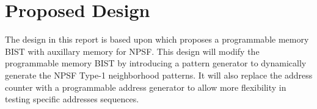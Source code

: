 \chapter{Proposed Design}
\label{chap:design}

The design in this report is based upon \cite{1584083} which proposes a programmable memory BIST with auxillary memory for NPSF.  This design will modify the programmable memory BIST by introducing a pattern generator to dynamically generate the NPSF Type-1 neighborhood patterns.  It will also replace the address counter with a programmable address generator to allow more flexibility in testing specific addresses sequences.





